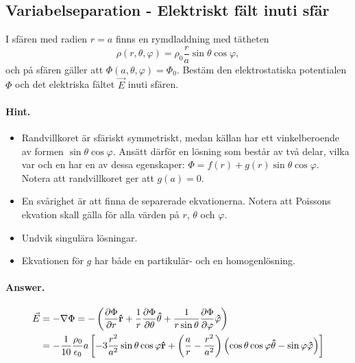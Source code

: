 \documentclass[%
oneside,                 %
final,                   %
10pt]{article}
\newenvironment{doconceexercise}{}{}
\newcounter{doconceexercisecounter}
\begin{document}
\begin{doconceexercise}

\subsection{Variabelseparation - Elektriskt fält inuti sfär}

I sfären med radien $r = a$ finns en 
rymdladdning med tätheten 
\begin{equation}
  \rho\left(r, \theta, \varphi\right) = \rho_0 \frac{r}{a} \sin \theta \cos
\varphi,
\end{equation}
och på sfären gäller att $\Phi\left(a,\theta,\varphi\right) = \Phi_0$.
Bestäm den elektrostatiska potentialen $\Phi$ och det elektriska fältet
$\vec{E}$ inuti sfären.


\paragraph{Hint.}
\begin{itemize}
\item Randvillkoret är sfäriskt symmetriskt, medan källan har ett vinkelberoende av formen $\sin \theta \cos \varphi$. Ansätt därför en lösning som består av två delar, vilka var och en har en av dessa egenskaper: $\Phi = f\left(r\right) + g\left(r\right) \sin \theta \cos \varphi$. Notera att randvillkoret ger att $g(a) = 0$.

\item En svårighet är att finna de separerade ekvationerna. Notera att Poissons ekvation skall gälla för alla värden på $r$, $\theta$ och $\varphi$. 

\item Undvik singulära lösningar.

\item Ekvationen för $g$ har både en partikulär- och en homogenlösning.
\end{itemize}

\noindent


\paragraph{Answer.}
\begin{align}
  \vec{E} &= - \nabla \Phi = - \left(\frac{\partial \Phi}{\partial r} 
{\bf \hat r} + \frac{1}{r} \frac{\partial \Phi}{\partial \theta} 
{\bf \hat \theta} + \frac{1}{r \sin \theta} 
\frac{\partial \Phi}{\partial \varphi} {\bf \hat \varphi}\right)
\nonumber \\
&= - \frac{1}{10}\frac{\rho_0}{\epsilon_0} a \left[-3 \frac{r^2}{a^2} \sin \theta
\cos \varphi {\bf \hat r} + \left(\frac{a}{r} - \frac{r^2}{a^2}\right) \left(
\cos \theta \cos \varphi {\bf \hat \theta} - \sin \varphi {\bf \hat \varphi}
\right) \right]
\end{align}


\end{doconceexercise}
\end{document}
